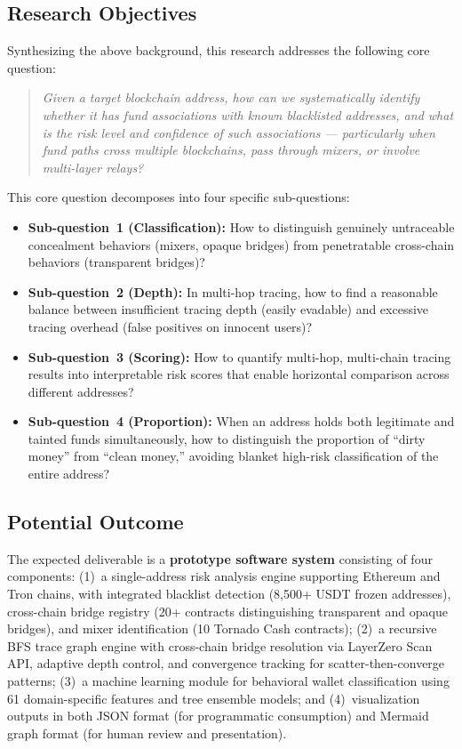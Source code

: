 \documentclass[12pt,a4paper]{article}
\begin{document}
\subsection{Research Objectives}

Synthesizing the above background, this research addresses the following core question:

\begin{quote}
\textit{Given a target blockchain address, how can we systematically identify whether it has fund associations with known blacklisted addresses, and what is the risk level and confidence of such associations --- particularly when fund paths cross multiple blockchains, pass through mixers, or involve multi-layer relays?}
\end{quote}

This core question decomposes into four specific sub-questions:
\begin{itemize}
    \item \textbf{Sub-question~1 (Classification):} How to distinguish genuinely untraceable concealment behaviors (mixers, opaque bridges) from penetratable cross-chain behaviors (transparent bridges)?
    \item \textbf{Sub-question~2 (Depth):} In multi-hop tracing, how to find a reasonable balance between insufficient tracing depth (easily evadable) and excessive tracing overhead (false positives on innocent users)?
    \item \textbf{Sub-question~3 (Scoring):} How to quantify multi-hop, multi-chain tracing results into interpretable risk scores that enable horizontal comparison across different addresses?
    \item \textbf{Sub-question~4 (Proportion):} When an address holds both legitimate and tainted funds simultaneously, how to distinguish the proportion of ``dirty money'' from ``clean money,'' avoiding blanket high-risk classification of the entire address?
\end{itemize}

\subsection{Potential Outcome}

The expected deliverable is a \textbf{prototype software system} consisting of four components: (1)~a single-address risk analysis engine supporting Ethereum and Tron chains, with integrated blacklist detection (8,500+ USDT frozen addresses), cross-chain bridge registry (20+ contracts distinguishing transparent and opaque bridges), and mixer identification (10 Tornado Cash contracts); (2)~a recursive BFS trace graph engine with cross-chain bridge resolution via LayerZero Scan API, adaptive depth control, and convergence tracking for scatter-then-converge patterns; (3)~a machine learning module for behavioral wallet classification using 61 domain-specific features and tree ensemble models; and (4)~visualization outputs in both JSON format (for programmatic consumption) and Mermaid graph format (for human review and presentation).
\end{document}
